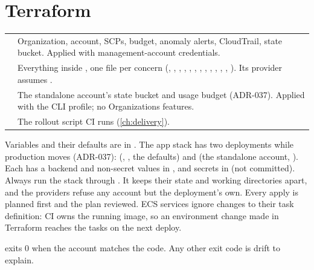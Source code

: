 \section{Terraform}
\begin{xltabular}{\linewidth}{@{}P{36mm} L@{}}
  \toprule
   & \\
  \midrule
   & Organization, account, SCPs, budget, anomaly alerts, CloudTrail, state bucket. Applied with management-account credentials.\\
   & Everything inside , one file per concern (, , , , , , , , , , , , ). Its provider assumes .\\
   & The standalone account's state bucket and usage budget (ADR-037). Applied with the  CLI profile; no Organizations features.\\
   & The rollout script CI runs (\cref{ch:delivery}).\\
  \bottomrule
\end{xltabular}

Variables and their defaults are in . The app stack has two
deployments while production moves (ADR-037):  (, ,
the defaults) and  (the standalone account, ). Each has a
backend and non-secret values in , and secrets in
 (not committed). Always run the stack through
. It keeps their state and working directories
apart, and the providers refuse any account but the deployment's own. Every apply is planned
first and the plan reviewed.
ECS services ignore changes to their task definition: CI owns the running image, so an
environment change made in Terraform reaches the tasks on the next deploy.

\begin{auditnote}
   exits 0 when the account matches
  the code. Any other exit code is drift to explain.
\end{auditnote}
